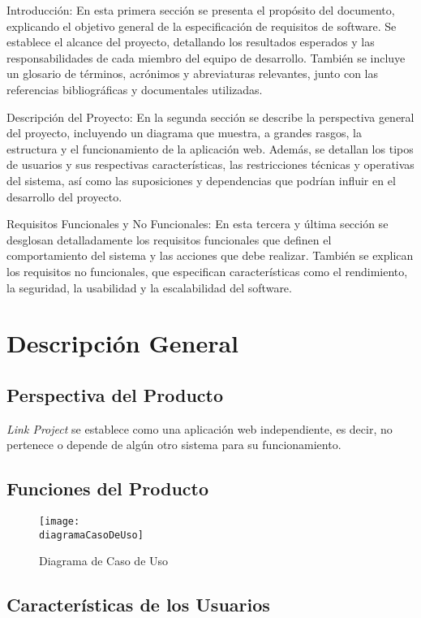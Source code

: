 	Introducción: En esta primera sección se presenta el propósito del documento, explicando
	el objetivo general de la especificación de requisitos de software. Se
	establece el alcance del proyecto, detallando los resultados esperados y las responsabilidades
	de cada miembro del equipo de desarrollo. También se incluye un glosario de
	términos, acrónimos y abreviaturas relevantes, junto con las referencias
	bibliográficas y documentales utilizadas.

	Descripción del Proyecto: En la segunda sección se describe la perspectiva general
	del proyecto, incluyendo un diagrama que muestra, a grandes rasgos, la
	estructura y el funcionamiento de la aplicación web. Además, se detallan los
	tipos de usuarios y sus respectivas características, las restricciones técnicas
	y operativas del sistema, así como las suposiciones y dependencias que podrían
	influir en el desarrollo del proyecto.

	Requisitos Funcionales y No Funcionales: En esta tercera y última sección se desglosan
	detalladamente los requisitos funcionales que definen el comportamiento del sistema
	y las acciones que debe realizar. También se explican los requisitos no
	funcionales, que especifican características como el rendimiento, la seguridad,
	la usabilidad y la escalabilidad del software.

	\clearpage
	\section{Descripción General}

	\subsection{Perspectiva del Producto}

	\emph{Link Project} se establece como una aplicación web independiente, es decir,
	no pertenece o depende de algún otro sistema para su funcionamiento.

	\subsection{Funciones del Producto}

	\begin{figure}[h]
		\centering
		\texttt{[image: \\diagramaCasoDeUso]}
		\caption{Diagrama de Caso de Uso}
	\end{figure}

	\subsection{Características de los Usuarios}

